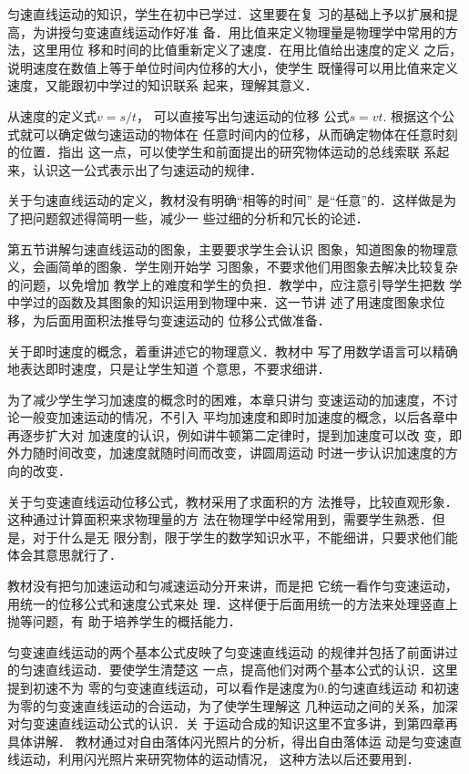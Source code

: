 匀速直线运动的知识，学生在初中已学过．这里要在复
习的基础上予以扩展和提高，为讲授匀变速直线运动作好准
备．用比值来定义物理量是物理学中常用的方法，这里用位
移和时间的比值重新定义了速度．在用比值给出速度的定义
之后，说明速度在数值上等于单位时间内位移的大小，使学生
既懂得可以用比值来定义速度，又能跟初中学过的知识联系
起来，理解其意义．

从速度的定义式$v=s/t$，
可以直接写出匀速运动的位移
公式$s=vt$. 根据这个公式就可以确定做匀速运动的物体在
任意时间内的位移，从而确定物体在任意时刻的位置．指出
这一点，可以使学生和前面提出的研究物体运动的总线索联
系起来，认识这一公式表示出了匀速运动的规律．

关于匀速直线运动的定义，教材没有明确“相等的时间”
是“任意”的．这样做是为了把问题叙述得简明一些，减少一
些过细的分析和冗长的论述．

第五节讲解匀速直线运动的图象，主要要求学生会认识
图象，知道图象的物理意义，会画简单的图象．学生刚开始学
习图象，不要求他们用图象去解决比较复杂的问题，以免增加
教学上的难度和学生的负担．教学中，应注意引导学生把数
学中学过的函数及其图象的知识运用到物理中来．这一节讲
述了用速度图象求位移，为后面用面积法推导匀变速运动的
位移公式做准备．

关于即时速度的概念，着重讲述它的物理意义．教材中
写了用数学语言可以精确地表达即时速度，只是让学生知道
个意思，不要求细讲．

为了减少学生学习加速度的概念时的困难，本章只讲匀
变速运动的加速度，不讨论一般变加速运动的情况，不引入
平均加速度和即时加速度的概念，以后各章中再逐步扩大对
加速度的认识，例如讲牛顿第二定律时，提到加速度可以改
变，即外力随时间改变，加速度就随时间而改变，讲圆周运动
时进一步认识加速度的方向的改变．

关于匀变速直线运动位移公式，教材采用了求面积的方
法推导，比较直观形象．这种通过计算面积来求物理量的方
法在物理学中经常用到，需要学生熟悉．但是，对于什么是无
限分割，限于学生的数学知识水平，不能细讲，只要求他们能
体会其意思就行了．

教材没有把匀加速运动和匀减速运动分开来讲，而是把
它统一看作匀变速运动，用统一的位移公式和速度公式来处
理．这样便于后面用统一的方法来处理竖直上抛等问题，有
助于培养学生的概括能力．

匀变速直线运动的两个基本公式皮映了匀变速直线运动
的规律并包括了前面讲过的匀速直线运动．要使学生清楚这
一点，提高他们对两个基本公式的认识．这里提到初速不为
零的匀变速直线运动，可以看作是速度为0.的匀速直线运动
和初速为零的匀变速直线运动的合运动，为了使学生理解这
几种运动之间的关系，加深对匀变速直线运动公式的认识．关
于运动合成的知识这里不宜多讲，到第四章再具体讲解．
教材通过对自由落体闪光照片的分析，得出自由落体运
动是匀变速直线运动，利用闪光照片来研究物体的运动情况，
这种方法以后还要用到．

